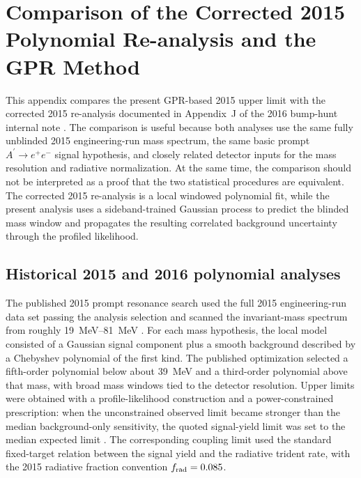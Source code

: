 \section{Comparison of the Corrected 2015 Polynomial Re-analysis and the GPR Method}
\label{app:2015-method-comparison}

This appendix compares the present GPR-based 2015 upper limit with the corrected
2015 re-analysis documented in Appendix~J of the 2016 bump-hunt internal note
\cite{HPS2016BumpInternal}.  The comparison is useful because both analyses use the
same fully unblinded 2015 engineering-run mass spectrum, the same basic prompt
$A^\prime\to e^+e^-$ signal hypothesis, and closely related detector inputs for the
mass resolution and radiative normalization.  At the same time, the comparison should
not be interpreted as a proof that the two statistical procedures are equivalent.  The
corrected 2015 re-analysis is a local windowed polynomial fit, while the present
analysis uses a sideband-trained Gaussian process to predict the blinded mass window
and propagates the resulting correlated background uncertainty through the profiled
likelihood.

\subsection{Historical 2015 and 2016 polynomial analyses}

The published 2015 prompt resonance search used the full 2015 engineering-run data set
passing the analysis selection and scanned the invariant-mass spectrum from roughly
\SIrange{19}{81}{MeV} \cite{HPS2015DarkPhoton,HPS2015InternalNote}.  For each mass
hypothesis, the local model consisted of a Gaussian signal component plus a smooth
background described by a Chebyshev polynomial of the first kind.  The published
optimization selected a fifth-order polynomial below about \SI{39}{MeV} and a
third-order polynomial above that mass, with broad mass windows tied to the detector
resolution.  Upper limits were obtained with a profile-likelihood construction and a
power-constrained prescription: when the unconstrained observed limit became stronger
than the median background-only sensitivity, the quoted signal-yield limit was set to
the median expected limit \cite{HPS2015InternalNote}.  The corresponding coupling
limit used the standard fixed-target relation between the signal yield and the
radiative trident rate, with the 2015 radiative fraction convention
$f_{\rm rad}=0.085$.


